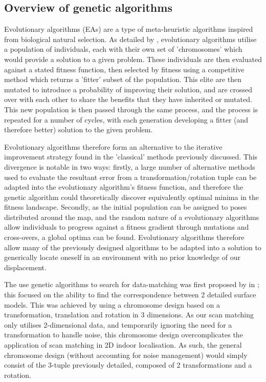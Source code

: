 \documentclass[authoryearcitations]{UoYCSproject}
\begin{document}
\subsection{Overview of genetic algorithms}
Evolutionary algorithms (EAs) are a type of meta-heuristic algorithms inspired from biological natural selection. As detailed by \citet{Whitley1994-tx}, evolutionary algorithms utilise a population of individuals, each with their own set of 'chromosomes' which would provide a solution to a given problem. These individuals are then evaluated against a stated fitness function, then selected by fitness using a competitive method which returns a 'fitter' subset of the population. This elite are then mutated to introduce a probability of improving their solution, and are crossed over with each other to share the benefits that they have inherited or mutated. This new population is then passed through the same process, and the process is repeated for a number of cycles, with each generation developing a fitter (and therefore better) solution to the given problem. 

Evolutionary algorithms therefore form an alternative to the iterative improvement strategy found in the 'classical' methods previously discussed. This divergence is notable in two ways: firstly, a large number of alternative methods used to evaluate the resultant error from a transformation/rotation tuple can be adapted into the evolutionary algorithm's fitness function, and therefore the genetic algorithm could theoretically discover equivalently optimal minima in the fitness landscape. Secondly, as the initial population can be assigned to poses distributed around the map, and the random nature of a evolutionary algorithms allow individuals to progress against a fitness gradient through mutations and cross-overs, a global optima can be found. Evolutionary algorithms therefore allow many of the previously designed algorithms to be adapted into a solution to generically locate oneself in an environment with no prior knowledge of our displacement.

The use genetic algorithms to search for data-matching was first proposed by \citet{Brunnstrom1996-vo} in \citeyear{Brunnstrom1996-vo}; this focused on the ability to find the correspondence between 2 detailed surface models. This was achieved by using a chromosome design based on a transformation, translation and rotation in 3 dimensions. As our scan matching only utilises 2-dimensional data, and temporarily ignoring the need for a transformation to handle noise, this chromosome design overcomplicates the application of scan matching in 2D indoor localisation. As such, the general chromosome design (without accounting for noise management) would simply consist of the 3-tuple previously detailed, composed of 2 transformations and a rotation.
\end{document}
